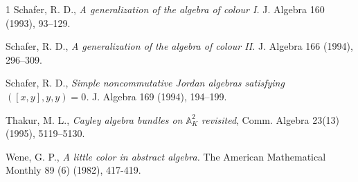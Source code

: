 \documentclass[10pt]{amsart}
\theoremstyle{plain}
\theoremstyle{definition}
\begin{document}
\begin{thebibliography}{1}
 Schafer, R. D., \emph{A generalization of the algebra of colour I.} J. Algebra 160 (1993), 93--129.

 Schafer, R. D., \emph{A generalization of the algebra of colour II.} J. Algebra 166 (1994), 296--309.

 Schafer, R. D., \emph{Simple noncommutative Jordan algebras satisfying $([x,y],y,y)=0$.} J. Algebra 169 (1994), 194--199.

 Thakur, M. L., {\it Cayley algebra bundles on $\mathbb{A}_K^2 $ revisited}, Comm. Algebra
23(13) (1995), 5119--5130.

 Wene, G. P., \emph{A little color in abstract algebra.}
The American Mathematical Monthly 89 (6) (1982), 417-419.

\end{thebibliography}
\end{document}
